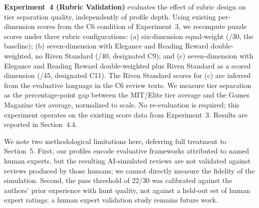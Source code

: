 \textbf{Experiment~4 (Rubric Validation)} evaluates the effect of rubric design on tier separation quality, independently of profile depth. Using existing per-dimension scores from the C6 condition of Experiment~3, we recompute puzzle scores under three rubric configurations: (a) six-dimension equal-weight (/30, the baseline); (b) seven-dimension with Elegance and Reading Reward double-weighted, no Riven Standard (/40, designated C9); and (c) seven-dimension with Elegance and Reading Reward double-weighted plus Riven Standard as a scored dimension (/45, designated C11). The Riven Standard scores for (c) are inferred from the evaluative language in the C6 review texts. We measure tier separation as the percentage-point gap between the MIT/Elite tier average and the Games Magazine tier average, normalized to scale. No re-evaluation is required; this experiment operates on the existing score data from Experiment~3. Results are reported in Section~4.4.

We note two methodological limitations here, deferring full treatment to Section~5. First, our profiles encode evaluative frameworks attributed to named human experts, but the resulting AI-simulated reviews are not validated against reviews produced by those humans; we cannot directly measure the fidelity of the simulation. Second, the pass threshold of 22/30 was calibrated against the authors' prior experience with hunt quality, not against a held-out set of human expert ratings; a human expert validation study remains future work.
